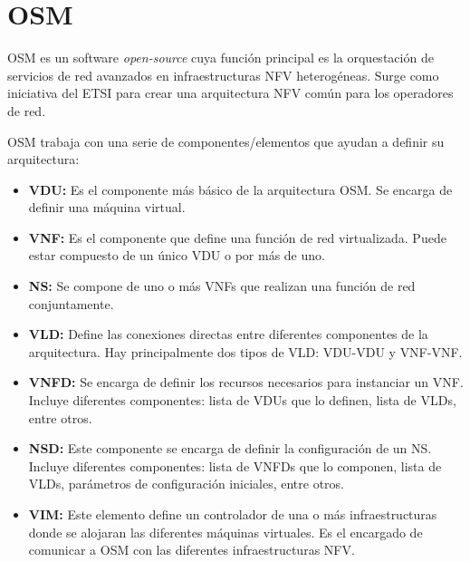 \section{OSM}
\label{sec:osm}

\ac{OSM}\cite{osmbib} es un software \textit{open-source} cuya función principal es la orquestación de servicios de red avanzados en infraestructuras \ac{NFV} heterogéneas. Surge como iniciativa del \ac{ETSI}\cite{etsibib} para crear una arquitectura \ac{NFV} común para los operadores de red.

\ac{OSM} trabaja con una serie de componentes/elementos que ayudan a definir su arquitectura:

\begin{itemize}
	\item \textbf{\ac{VDU}:} Es el componente más básico de la arquitectura \ac{OSM}. Se encarga de definir una máquina virtual. 

	\item \textbf{\ac{VNF}:} Es el componente que define una función de red virtualizada. Puede estar compuesto de un único \ac{VDU} o por más de uno.
	
	\item \textbf{\ac{NS}:} Se compone de uno o más \acp{VNF} que realizan una función de red conjuntamente.
	
	\item \textbf{\ac{VLD}:} Define las conexiones directas entre diferentes componentes de la arquitectura. Hay principalmente dos tipos de \ac{VLD}: \ac{VDU}-\ac{VDU} y \ac{VNF}-\ac{VNF}.
	
	\item \textbf{\ac{VNFD}:} Se encarga de definir los recursos necesarios para instanciar un \ac{VNF}. Incluye diferentes componentes: lista de \acp{VDU} que lo definen, lista de \acp{VLD}, entre otros.
	
	\item \textbf{\ac{NSD}:} Este componente se encarga de definir la configuración de un \ac{NS}. Incluye diferentes componentes: lista de \acp{VNFD} que lo componen, lista de \acp{VLD}, parámetros de configuración iniciales, entre otros.
	
	\item \textbf{\ac{VIM}:} Este elemento define un controlador de una o más infraestructuras donde se alojaran las diferentes máquinas virtuales. Es el encargado de comunicar a \ac{OSM} con las diferentes infraestructuras \ac{NFV}.
\end{itemize}

